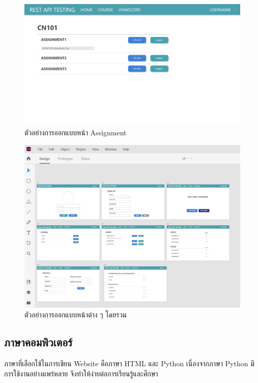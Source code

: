 \begin{figure}[!thb]
	\captionsetup{justification=centering}
	\centering
	\includegraphics[width=5in]{latex/figures/assignmentxd.jpg}
	\caption{ตัวอย่างการออกแบบหน้า Assignment}
	\label{fig:assignmentxd}
\end{figure}

\begin{figure}[!thb]
	\captionsetup{justification=centering}
	\centering
	\includegraphics[width=5in]{latex/figures/mockup.png}
	\caption{ตัวอย่างการออกแบบหน้าต่าง ๆ โดยรวม}
	\label{fig:mockup}
\end{figure}
\newpage

\subsection{ภาษาคอมพิวเตอร์}
ภาษาที่เลือกใช้ในการเขียน Website คือภาษา HTML และ Python เนื่องจากภาษา Python มีการใช้งานอย่างแพร่หลาย จึงทำให้ง่ายต่อการเรียนรู้และศึกษา

